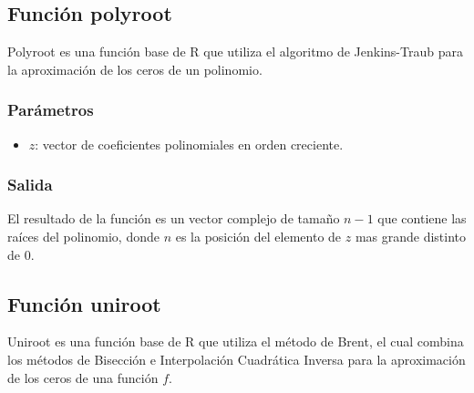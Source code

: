 \documentclass[a4paper,12pt]{article}
\begin{document}
\subsection{Función polyroot}

Polyroot es una función base de R que utiliza el algoritmo de Jenkins-Traub para la aproximación de los ceros de un polinomio.

\par

\subsubsection{Parámetros}
\begin{itemize}
    \item $z$: vector de coeficientes polinomiales en orden creciente.
\end{itemize}
 
\subsubsection{Salida}

El resultado de la función es un vector complejo de tamaño $n-1$ que contiene las raíces del polinomio, donde $n$ es la posición del elemento de $z$ mas grande distinto de $0$.


\subsection{Función uniroot}
Uniroot es una función base de R que utiliza el método de Brent, el cual combina los métodos de Bisección e Interpolación Cuadrática Inversa para la aproximación de los ceros de una función $f$.
\par 
\end{document}
